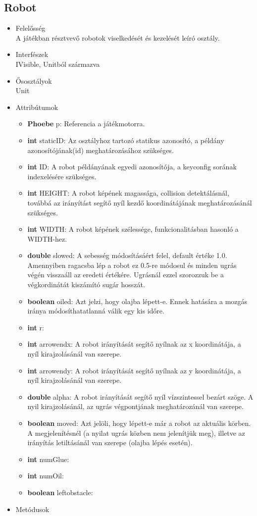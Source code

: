 \subsection{Robot}
\begin{itemize}
\item Felelősség\\
A játékban résztvevő robotok viselkedését és kezelését leíró osztály.
\item Interfészek\\
IVisible, Unitból származva
\item Ősosztályok\\
Unit
\item Attribútumok
	\begin{itemize}
    	\item \textbf{Phoebe} p: Referencia a játékmotorra.
		\item \textbf{int} staticID: Az osztályhoz tartozó statikus azonosító, a példány                azonosítójának(id) meghatározásához szükséges.
		\item \textbf{int} ID: A robot példányának egyedi azonosítója, a keyconfig sorának indexelésére szükséges.
		\item \textbf{int} HEIGHT: A robot képének magassága, collision                      detektálásnál, továbbá az irányítást segítő nyíl kezdő koordinátájának                  meghatározásánál szükséges.
		\item \textbf{int} WIDTH: A robot képének szélessége, funkcionalitásban hasonló a WIDTH-hez.

		\item \textbf{double} slowed: A sebesség módosításáért felel, default értéke 1.0. Amennyiben ragacsba lép a robot ez 0.5-re módosul és minden ugrás végén visszaáll az eredeti értékére. Ugrásnál ezzel szorozzuk be a végkordinátát kiszámító sugár hosszát.
		\item \textbf{boolean} oiled: Azt jelzi, hogy olajba lépett-e. Ennek hatására a mozgás iránya módosíthatatlanná válik egy kis időre.
		\item \textbf{int} r: 
		\item \textbf{int} arrowendx: A robot irányítását segítő nyílnak az x koordinátája, a nyíl kirajzolásánál van szerepe.
		\item \textbf{int} arrowendy: A robot irányítását segítő nyílnak az y koordinátája, a nyíl kirajzolásánál van szerepe.
		\item \textbf{double} alpha: A robot irányítását segítő nyíl vízszintessel bezárt szöge. A nyil kirajzolásánál, az ugrás végpontjának meghatározánál van szerepe.
		\item \textbf{boolean} moved: Azt jelöli, hogy lépett-e már a robot az aktuális körben. A megjelenítésnél (a nyilat ugrás közben nem jelenítjük meg), illetve az irányítás letiltásánál van szerepe (olajba lépés esetén).
		\item \textbf{int} numGlue: 
	    \item \textbf{int} numOil: 
	    \item \textbf{boolean} leftobstacle: 
\end{itemize}
\item Metódusok


\end{itemize}
